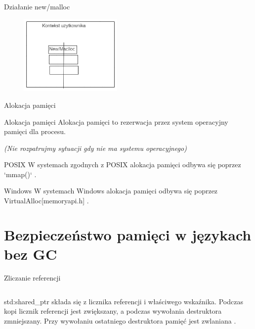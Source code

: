\documentclass{beamer}
\begin{document}
\begin{frame}{Działanie new/malloc}
    \begin{figure}
        \centering
        \includegraphics[width=5cm]{new_no_context_switch.png}
    \end{figure}
\end{frame}


\begin{frame}{Alokacja pamięci}
    \begin{block}{Alokacja pamięci}
        Alokacja pamięci to rezerwacja przez system operacyjny pamięci dla procesu\cite{mmap-linux_man, virtual-alloc}.
        
        \textit{(Nie rozpatrujmy sytuacji gdy nie ma systemu operacyjnego)}
    \end{block}
    \begin{block}{POSIX}
        W systemach zgodnych z POSIX alokacja pamięci odbywa się poprzez  `mmap()` \cite{mmap-linux_man}.
    \end{block}

    \begin{block}{Windows}
        W systemach Windows alokacja pamięci odbywa się poprzez VirtualAlloc[memoryapi.h] \cite{virtual-alloc}.
    \end{block}
\end{frame}

\section{Bezpieczeństwo pamięci w językach bez GC}

\begin{frame}{Zliczanie referencji}
    \inputminted{cpp}{shared_ptr.cpp}
    \begin{block}{}
        std:shared\_ptr składa się z licznika referencji i właściwego wskaźnika.  
        Podczas kopi licznik referencji jest zwiększany, a podczas wywołania destruktora zmniejszany. 
        Przy wywołaniu ostatniego destruktora pamięć jest zwlaniana \cite{cpp-shared-ptr}. 
    \end{block}
\end{frame}
\end{document}
